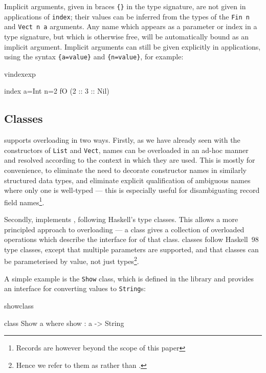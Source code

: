 \noindent
Implicit arguments, given in braces \texttt{\{\}} in the type signature, are
not given in applications of \texttt{index}; their values can be inferred from
the types of the \texttt{Fin n} and \texttt{Vect n a} arguments. Any name which
appears as a parameter or index in a type signature, but which is otherwise
free, will be automatically bound as an implicit argument.  Implicit arguments
can still be given explicitly in applications, using the syntax
\texttt{\{a=value\}} and \texttt{\{n=value\}}, for example:

\begin{SaveVerbatim}{vindexexp}

index {a=Int} {n=2} fO (2 :: 3 :: Nil)

\end{SaveVerbatim}

\subsection{Classes}

\Idris{} supports overloading in two ways. Firstly, as we have already seen
with the constructors of \texttt{List} and \texttt{Vect}, names can be
overloaded in an ad-hoc manner and resolved according to the context in which
they are used. This is mostly for convenience, to eliminate the need to
decorate constructor names in similarly structured data types, and eliminate
explicit qualification of ambiguous names where only one is well-typed --- this
is especially useful for disambiguating record field names\footnote{Records are
however beyond the scope of this paper}.

Secondly, \Idris{} implements , following Haskell's type
classes.  This allows a more principled approach to overloading --- a class
gives a collection of overloaded operations which describe the interface for
 of that class. \Idris{} classes follow Haskell~98 type
classes, except that multiple parameters are supported, and that classes can be
parameterised by  value, not just types\footnote{Hence we refer to
them as  rather than .}.

A simple example is the \texttt{Show} class, which is defined in the
library and provides an interface for converting values to \texttt{String}s:

\begin{SaveVerbatim}{showclass}

class Show a where
    show : a -> String

\end{SaveVerbatim}

